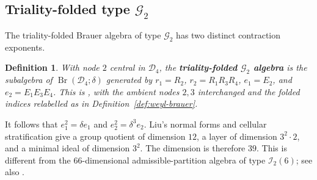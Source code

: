\documentclass[11pt,a4paper]{amsart}
\newcommand{\Br}{\operatorname{Br}}\newcommand{\Irr}{\operatorname{Irr}}
\theoremstyle{uprightdefinition}
\newtheorem{definition}[theorem]{Definition}
\theoremstyle{remark}\newtheorem{remark}[theorem]{Remark}
\begin{document}
\subsection{Triality-folded type \texorpdfstring{$\mathscr{G}_2$}{G2}}
\label{subsec:G2-certified}
The triality-folded Brauer algebra of type $\mathscr{G}_2$ has two
distinct contraction exponents.

\begin{definition}\label{def:g2-model}
With node $2$ central in $\mathscr{D}_4$, the \textbf{triality-folded $\mathscr{G}_2$ algebra}
is the subalgebra of $\Br(\mathscr{D}_4;\delta)$ generated by
$r_1=R_2$, $r_2=R_1R_3R_4$, $e_1=E_2$, and $e_2=E_1E_3E_4$.
This is \cite[Theorem~6.1]{LiuG22015}, with the ambient nodes
$2,3$ interchanged and the folded indices relabelled as in
Definition~\ref{def:weyl-brauer}.
\end{definition}

It follows that $e_1^2=\delta e_1$ and $e_2^2=\delta^3e_2$.
Liu's normal forms and cellular stratification
\cite[Lemma~9.7 and Theorems~6.1, 10.1]{LiuG22015} give a group
quotient of dimension $12$, a layer of dimension $3^2\cdot2$, and a
minimal ideal of dimension $3^2$. The dimension is therefore $39$.
This is different from the $66$-dimensional admissible-partition algebra
of type $\mathscr{I}_2(6)$; see also \cite[Remark~10.2]{LiuG22015}.
\end{document}
